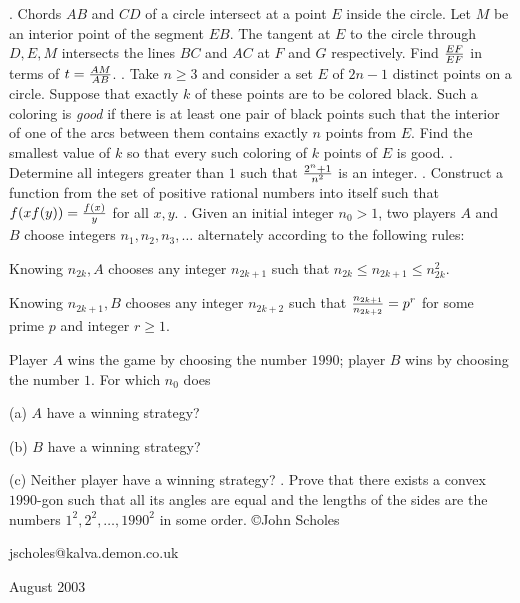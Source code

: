 \nopagenumbers
{}
\vskip 25pt
. Chords $AB$ and $CD$ of a circle intersect at a point $E$ inside the circle. Let $M$ be an interior point of the segment $EB$. The tangent at $E$ to the circle through $D,E,M$ intersects the lines $BC$ and $AC$ at $F$ and $G$ respectively. Find $EF\over EF$ in terms of $t={AM\over AB}$.
\vskip 12pt
. Take $n\ge3$ and consider a set $E$ of $2n-1$ distinct points on a circle. Suppose that exactly $k$ of these points are to be colored black. Such a coloring is {\it good} if there is at least one pair of black points such that the interior of one of the arcs between them contains exactly $n$ points from $E$. Find the smallest value of $k$ so that every such coloring of $k$ points of $E$ is good.
\vskip 12pt
. Determine all integers greater than $1$ such that $2^n+1\over n^2$ is an integer.
\vskip 12pt
. Construct a function from the set of positive rational numbers into itself such that $f(xf(y))={f(x)\over y}$ for all $x,y$.
\vskip 12pt
. Given an initial integer $n_0>1$, two players $A$ and $B$ choose integers $n_1,n_2,n_3,\ldots$ alternately according to the following rules:

Knowing $n_{2k}, A$ chooses any integer $n_{2k+1}$ such that $n_{2k}\le n_{2k+1}\le n_{2k}^2$.

Knowing $n_{2k+1},B$ chooses any integer $n_{2k+2}$ such that ${n_{2k+1}\over n_{2k+2}}=p^r$ for some prime $p$ and integer $r\ge 1$.

\noindent Player $A$ wins the game by choosing the number $1990$; player $B$ wins by choosing the number $1$. For which $n_0$ does

(a) $A$ have a winning strategy?

(b) $B$ have a winning strategy?

(c) Neither player have a winning strategy?
\vskip 12pt
. Prove that there exists a convex $1990$-gon such that all its angles are equal and the lengths of the sides are the numbers $1^2,2^2,\ldots, 1990^2$ in some order.
\vskip 20pt
\noindent \copyright John Scholes

\noindent jscholes@kalva.demon.co.uk

 August 2003

\bye

